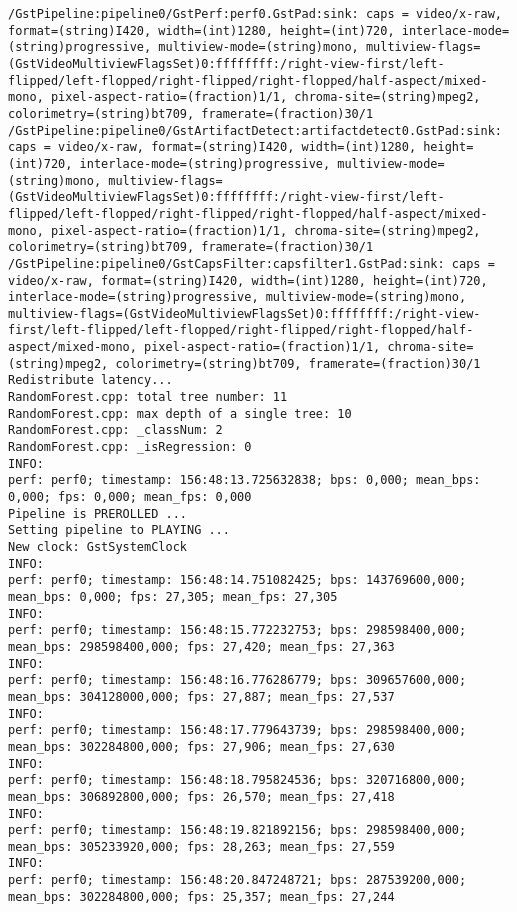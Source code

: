 \documentclass[12pt,oneside]{book}
\begin{document}
\begin{lstlisting}
/GstPipeline:pipeline0/GstPerf:perf0.GstPad:sink: caps = video/x-raw, format=(string)I420, width=(int)1280, height=(int)720, interlace-mode=(string)progressive, multiview-mode=(string)mono, multiview-flags=(GstVideoMultiviewFlagsSet)0:ffffffff:/right-view-first/left-flipped/left-flopped/right-flipped/right-flopped/half-aspect/mixed-mono, pixel-aspect-ratio=(fraction)1/1, chroma-site=(string)mpeg2, colorimetry=(string)bt709, framerate=(fraction)30/1
/GstPipeline:pipeline0/GstArtifactDetect:artifactdetect0.GstPad:sink: caps = video/x-raw, format=(string)I420, width=(int)1280, height=(int)720, interlace-mode=(string)progressive, multiview-mode=(string)mono, multiview-flags=(GstVideoMultiviewFlagsSet)0:ffffffff:/right-view-first/left-flipped/left-flopped/right-flipped/right-flopped/half-aspect/mixed-mono, pixel-aspect-ratio=(fraction)1/1, chroma-site=(string)mpeg2, colorimetry=(string)bt709, framerate=(fraction)30/1
/GstPipeline:pipeline0/GstCapsFilter:capsfilter1.GstPad:sink: caps = video/x-raw, format=(string)I420, width=(int)1280, height=(int)720, interlace-mode=(string)progressive, multiview-mode=(string)mono, multiview-flags=(GstVideoMultiviewFlagsSet)0:ffffffff:/right-view-first/left-flipped/left-flopped/right-flipped/right-flopped/half-aspect/mixed-mono, pixel-aspect-ratio=(fraction)1/1, chroma-site=(string)mpeg2, colorimetry=(string)bt709, framerate=(fraction)30/1
Redistribute latency...
RandomForest.cpp: total tree number: 11
RandomForest.cpp: max depth of a single tree: 10
RandomForest.cpp: _classNum: 2
RandomForest.cpp: _isRegression: 0
INFO:
perf: perf0; timestamp: 156:48:13.725632838; bps: 0,000; mean_bps: 0,000; fps: 0,000; mean_fps: 0,000
Pipeline is PREROLLED ...
Setting pipeline to PLAYING ...
New clock: GstSystemClock
INFO:
perf: perf0; timestamp: 156:48:14.751082425; bps: 143769600,000; mean_bps: 0,000; fps: 27,305; mean_fps: 27,305
INFO:
perf: perf0; timestamp: 156:48:15.772232753; bps: 298598400,000; mean_bps: 298598400,000; fps: 27,420; mean_fps: 27,363
INFO:
perf: perf0; timestamp: 156:48:16.776286779; bps: 309657600,000; mean_bps: 304128000,000; fps: 27,887; mean_fps: 27,537
INFO:
perf: perf0; timestamp: 156:48:17.779643739; bps: 298598400,000; mean_bps: 302284800,000; fps: 27,906; mean_fps: 27,630
INFO:
perf: perf0; timestamp: 156:48:18.795824536; bps: 320716800,000; mean_bps: 306892800,000; fps: 26,570; mean_fps: 27,418
INFO:
perf: perf0; timestamp: 156:48:19.821892156; bps: 298598400,000; mean_bps: 305233920,000; fps: 28,263; mean_fps: 27,559
INFO:
perf: perf0; timestamp: 156:48:20.847248721; bps: 287539200,000; mean_bps: 302284800,000; fps: 25,357; mean_fps: 27,244

\end{lstlisting}
\end{document}
